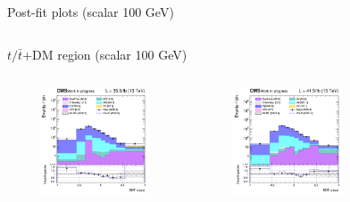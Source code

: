 \documentclass[8pt]{beamer}
\begin{document}
\begin{frame}{Post-fit plots (scalar 100 GeV)}
\begin{columns}
\begin{column}{1.09\textwidth}
\begin{block}{\centering $t/\bar t$+DM region (scalar 100 GeV)}\end{block} \vspace{10pt}
\end{column}
\end{columns} \vspace{-24pt}
\begin{columns}
		\begin{column}{0.33\textwidth}
			\begin{center}
			\begin{block}{}\end{block}	
     			\includegraphics[width=1.0\textwidth, height=90pt]{figs/postfits/2016/log_cratio_ST_topCR_ll_BDT_tDM100_TTbar_BDT_output_scalar100_customBinsAttempt7.png}
    		\end{center}		
		\end{column} 
		\begin{column}{0.33\textwidth}
			\begin{center}
			\begin{block}{}\end{block}	
     			\includegraphics[width=1.0\textwidth, height=90pt]{figs/postfits/2017/log_cratio_ST_topCR_ll_BDT_tDM100_TTbar_BDT_output_scalar100_customBinsAttempt7.png}
    		\end{center}		
		\end{column} 
		\begin{column}{0.33\textwidth}
			\begin{center}
			\begin{block}{}\end{block}	

\end{center}
\end{column}
\end{columns}
\end{frame}
\end{document}
